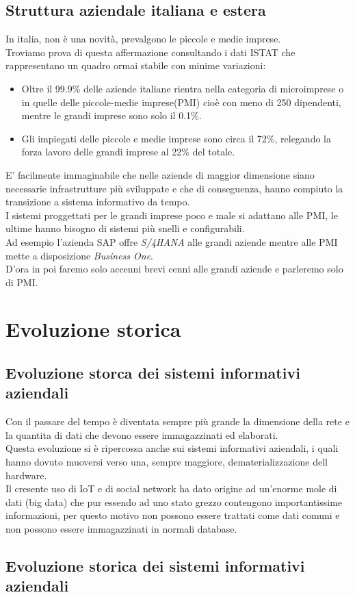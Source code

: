 \documentclass{book}
\begin{document}
    \subsection{Struttura aziendale italiana e estera}
    In italia, non è una novità, prevalgono le piccole e medie imprese.\\
    Troviamo prova di questa affermazione consultando i dati ISTAT che rappresentano un quadro ormai stabile con minime variazioni:
    \begin{itemize}
        \item Oltre il 99.9\% delle aziende italiane rientra nella categoria di microimprese o in quelle delle piccole-medie imprese(PMI) cioè con meno di 250 dipendenti, mentre le grandi imprese sono solo il 0.1\%.
        \item Gli impiegati delle piccole e medie imprese sono circa il 72\%, relegando la forza lavoro delle grandi imprese al 22\% del totale.
    \end{itemize}
    E' facilmente immaginabile che nelle aziende di maggior dimensione siano necessarie infrastrutture più sviluppate e che di conseguenza, hanno compiuto la transizione a sistema informativo da tempo.\\
    I sistemi proggettati per le grandi imprese poco e male si adattano alle PMI, le ultime hanno bisogno di sistemi più snelli e configurabili.\\
    Ad esempio l'azienda SAP offre \emph{S/4HANA} alle grandi aziende mentre alle PMI mette a disposizione \emph{Business One}.\\
    D'ora in poi faremo solo accenni brevi cenni alle grandi aziende e parleremo solo di PMI.
    \section{Evoluzione storica}
    \subsection{Evoluzione storca dei sistemi informativi aziendali}
    Con il passare del tempo è diventata sempre più grande la dimensione della rete e la quantita di dati che devono essere immagazzinati ed elaborati.\\
    Questa evoluzione si è ripercossa anche sui sistemi informativi aziendali, i quali hanno dovuto muoversi verso una, sempre maggiore, dematerializzazione dell hardware.\\
    Il cresente uso di IoT e di social network ha dato origine ad un'enorme mole di dati (big data) che pur essendo ad uno stato grezzo contengono importantissime informazioni, per questo motivo non possono essere trattati come dati comuni e non possono essere immagazzinati in normali database.
    \subsection{Evoluzione storica dei sistemi informativi aziendali}
\end{document}
